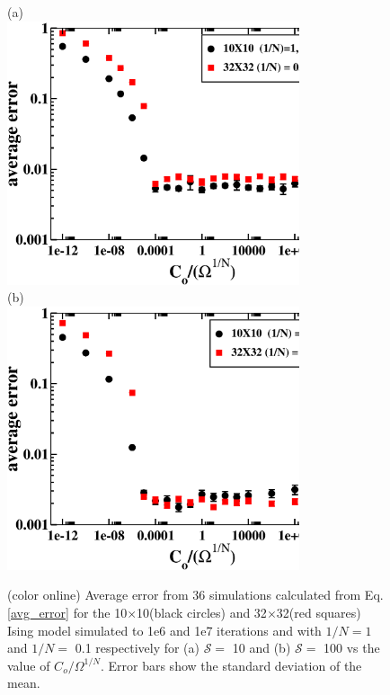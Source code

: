 \documentclass[aps,pre,reprint,superscriptaddress,showkeys]{revtex4-1}
\begin{document}
\begin{figure}[h!]
(a)\\
\includegraphics[width=8.6cm]{fig3a.eps}\\
(b)\\
\includegraphics[width=8.6cm]{fig3b.eps}\\
\caption{(color online) Average error from 36 simulations calculated from Eq. \ref{avg_error} for the 10$\times$10(black circles) and 32$\times$32(red squares) Ising model simulated to 1e6 and 1e7 iterations and  with $1/N=1$ and $1/N=$ 0.1 respectively for (a)  $\mathcal{S}=$ 10 and (b) $\mathcal{S}=$ 100 vs the value of $C_{o}/\Omega^{1/N}$. Error bars show the standard deviation of the mean.  \label{optimalCo}}
\end{figure}
\end{document}
